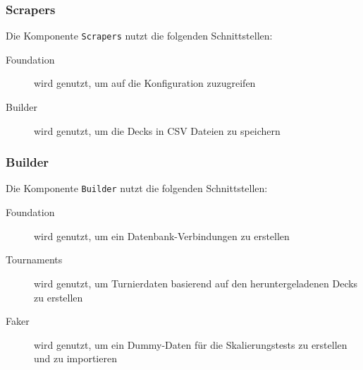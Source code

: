 \subsubsection*{Scrapers}
Die Komponente \verb|Scrapers| nutzt die folgenden Schnittstellen:
\begin{description}
    \item[Foundation] wird genutzt, um auf die Konfiguration zuzugreifen
    
    \item[Builder] wird genutzt, um die Decks in \ac{CSV} Dateien zu speichern
\end{description}

\subsubsection*{Builder}
Die Komponente \verb|Builder| nutzt die folgenden Schnittstellen:
\begin{description}
    \item[Foundation] wird genutzt, um ein Datenbank-Verbindungen zu erstellen
    \item[Tournaments] wird genutzt, um Turnierdaten basierend auf den heruntergeladenen Decks zu erstellen
    \item[Faker] wird genutzt, um ein Dummy-Daten für die Skalierungstests zu erstellen und zu importieren
\end{description}

